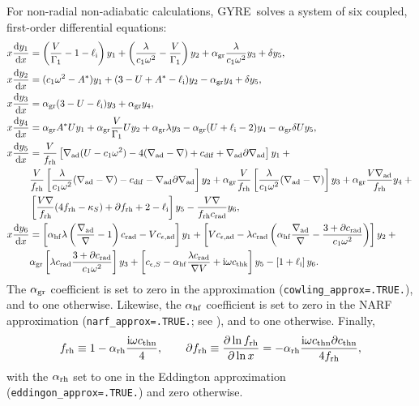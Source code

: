 \documentclass[fleqn]{article}
\newcommand{\gyre}{GYRE}
\newcommand{\diff}{\mathrm{d}}
\newcommand{\ii}{\mathrm{i}}
\newcommand{\elli}{\ell_{\rm i}}
\newcommand{\Vg}{\frac{V}{\Gamma_{1}}}
\newcommand{\As}{A^{\ast}}
\newcommand{\nabad}{\nabla_{\rm ad}}
\newcommand{\dnabad}{\partial\nabad}
\newcommand{\kapS}{\kappa_{S}}
\newcommand{\crad}{c_{\rm rad}}
\newcommand{\dcrad}{\partial\crad}
\newcommand{\cepsad}{c_{\epsilon,{\rm ad}}}
\newcommand{\cepsS}{c_{\epsilon,S}}
\newcommand{\cdif}{c_{\rm dif}}
\newcommand{\cthn}{c_{\rm thn}}
\newcommand{\dcthn}{\partial\cthn}
\newcommand{\cthk}{c_{\rm thk}}
\newcommand{\agr}{\alpha_{\rm gr}}
\newcommand{\ahf}{\alpha_{\rm hf}}
\newcommand{\arh}{\alpha_{\rm rh}}
\newcommand{\frh}{f_{\rm rh}}
\newcommand{\dfrh}{\partial f_{\rm rh}}
\begin{document}
For non-radial non-adiabatic calculations, \gyre\ solves a system of
six coupled, first-order differential equations:
\begin{align*}
x \frac{\diff y_{1}}{\diff x} &=
\left(\Vg - 1 - \elli \right) y_{1} +
\left(\frac{\lambda}{c_{1} \omega^{2}} - \Vg \right) y_{2} +
\agr \frac{\lambda}{c_{1} \omega^{2}} y_{3} +
\delta y_{5}, \\
x \frac{\diff y_{2}}{\diff x} &=
(c_{1} \omega^{2} - \As ) y_{1} +
(3 - U + \As - \elli) y_{2} -
\agr y_{4} +
\delta y_{5}, \\
x \frac{\diff y_{3}}{\diff x} &=
\agr (3 - U - \elli) y_{3} +
\agr y_{4}, \\
x \frac{\diff y_{4}}{\diff x} &=
\agr \As U y_{1} +
\agr \Vg U y_{2} +
\agr \lambda y_{3} -
\agr (U + \elli - 2) y_{4}
- \agr \delta U y_{5}, \\
x \frac{\diff y_{5}}{\diff x} &=
\frac{V}{\frh} \left[ \nabad (U - c_{1}\omega^{2}) - 4 (\nabad - \nabla) + \cdif + \nabad \dnabad \right] y_{1} + \mbox{} \\
&
\frac{V}{\frh} \left[ \frac{\lambda}{c_{1} \omega^{2}} (\nabad - \nabla) - \cdif - \nabad \dnabad \right] y_{2} +
\agr \frac{V}{\frh} \left[ \frac{\lambda}{c_{1} \omega^{2}} (\nabad - \nabla) \right] y_{3} + \agr \frac{V \nabad}{\frh} y_{4} + \mbox{} \\
& 
\left[ \frac{V \nabla}{\frh} (4 \frh - \kapS) + \dfrh + 2 - \elli \right] y_{5} -
\frac{V \nabla}{\frh \crad} y_{6}, \\
x \frac{\diff y_{6}}{\diff x} &=
\left[ \ahf \lambda\left( \frac{\nabad}{\nabla} - 1 \right) \crad - V \cepsad \right] y_{1} +
\left[ V \cepsad - \lambda \crad \left( \ahf \frac{\nabad}{\nabla} - \frac{3 + \dcrad}{c_{1}\omega^{2}} \right) \right] y_{2} + \mbox{} \\
&
\agr \left[ \lambda \crad \frac{3 + \dcrad}{c_{1}\omega^{2}} \right] y_{3} +
\left[ \cepsS - \ahf \frac{\lambda\crad}{\nabla V} + \ii \omega \cthk\right] y_{5} -
\left[ 1 + \elli \right] y_{6}.
\end{align*}
The $\agr$ coefficient is set to zero in the \citet{Cowling:1941aa}
approximation (\texttt{cowling\_approx=.TRUE.}), and to one
otherwise. Likewise, the $\ahf$ coefficient is set to zero in the NARF
approximation (\texttt{narf\_approx=.TRUE.}; see
\citealp{Townsend:2005ab}), and to one otherwise. Finally,
\begin{equation}
  \frh \equiv 1 - \arh \frac{\ii \omega \cthn}{4}, \qquad \dfrh \equiv \frac{\partial \ln \frh}{\partial \ln x} = - \arh \frac{\ii \omega \cthn \dcthn}{4 \frh},
\end{equation}
with the $\arh$ set to one in the Eddington approximation
(\texttt{eddingon\_approx=.TRUE.}) and zero otherwise.
\end{document}
